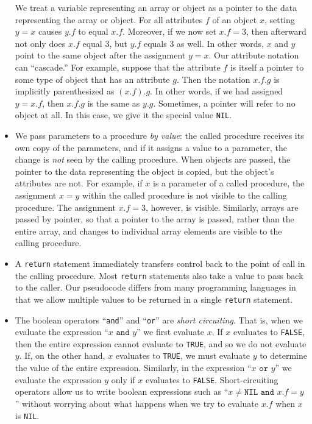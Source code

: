 \documentclass{report}
\begin{document}
\begin{itemize}
            \bigbreak \noindent 
            We treat a variable representing an array or object as a pointer to the data representing the array or object. For all attributes \( f \) of an object \( x \), setting \( y = x \) causes \( y.f \) to equal \( x.f \). Moreover, if we now set \( x.f = 3 \), then afterward not only does \( x.f \) equal 3, but \( y.f \) equals 3 as well. In other words, \( x \) and \( y \) point to the same object after the assignment \( y = x \).
            \bigbreak \noindent 
            Our attribute notation can ``cascade.'' For example, suppose that the attribute \( f \) is itself a pointer to some type of object that has an attribute \( g \). Then the notation \( x.f.g \) is implicitly parenthesized as \( (x.f).g \). In other words, if we had assigned \( y = x.f \), then \( x.f.g \) is the same as \( y.g \).
            \bigbreak \noindent 
            Sometimes, a pointer will refer to no object at all. In this case, we give it the special value \texttt{NIL}.
        \item We pass parameters to a procedure \textit{by value}: the called procedure receives its own copy of the parameters, and if it assigns a value to a parameter, the change is \textit{not} seen by the calling procedure. When objects are passed, the pointer to the data representing the object is copied, but the object’s attributes are not. For example, if \( x \) is a parameter of a called procedure, the assignment \( x = y \) within the called procedure is not visible to the calling procedure. The assignment \( x.f = 3 \), however, is visible. Similarly, arrays are passed by pointer, so that a pointer to the array is passed, rather than the entire array, and changes to individual array elements are visible to the calling procedure.
        \item A \texttt{return} statement immediately transfers control back to the point of call in the calling procedure. Most \texttt{return} statements also take a value to pass back to the caller. Our pseudocode differs from many programming languages in that we allow multiple values to be returned in a single \texttt{return} statement.
        \item The boolean operators ``\texttt{and}'' and ``\texttt{or}'' are \textit{short circuiting}. That is, when we evaluate the expression ``\( x \texttt{ and } y \)'' we first evaluate \( x \). If \( x \) evaluates to \texttt{FALSE}, then the entire expression cannot evaluate to \texttt{TRUE}, and so we do not evaluate \( y \). If, on the other hand, \( x \) evaluates to \texttt{TRUE}, we must evaluate \( y \) to determine the value of the entire expression. Similarly, in the expression ``\( x \texttt{ or } y \)'' we evaluate the expression \( y \) only if \( x \) evaluates to \texttt{FALSE}. Short-circuiting operators allow us to write boolean expressions such as ``\( x \neq \texttt{NIL} \texttt{ and } x.f = y \)'' without worrying about what happens when we try to evaluate \( x.f \) when \( x \) is \texttt{NIL}.

\end{itemize}
\end{document}
